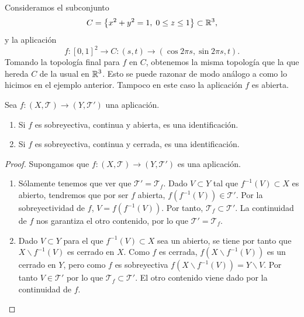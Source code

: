 \begin{eg}
Consideramos el subconjunto 
\[ C = \left\{ x^{2}+y^{2}=1, \; 0 \leq z \leq 1\right\} \subset \mathbb{R}^{3} ,\]
y la aplicación 
\[f : \left[0,1\right] ^{2} \to C : \left(s,t\right)\to \left(\cos 2\pi s, \sin 2\pi s, t\right) .\]
Tomando la topología final para $\displaystyle f $ en $\displaystyle C $, obtenemos la misma topología que la que hereda $\displaystyle C $ de la usual en $\displaystyle \mathbb{R}^{3} $. Esto se puede razonar de modo análogo a como lo hicimos en el ejemplo anterior. Tampoco en este caso la aplicación $\displaystyle f $ es abierta. 
\end{eg}
\begin{prop}
	Sea $\displaystyle f : \left(X, \mathcal{T}\right)\to \left(Y, \mathcal{T}'\right) $ una aplicación. 
	\begin{enumerate}
	\item Si $\displaystyle f $ es sobreyectiva, continua y abierta, es una identificación.
	\item Si $\displaystyle f $ es sobreyectiva, continua y cerrada, es una identificación.
	\end{enumerate}
\end{prop}
\begin{proof}
Supongamos que $\displaystyle f : \left(X, \mathcal{T}\right)\to \left(Y, \mathcal{T}'\right) $ es una aplicación. 
\begin{enumerate}
\item Sólamente tenemos que ver que $\displaystyle \mathcal{T}'=\mathcal{T}_{f} $. Dado $\displaystyle V \subset Y $ tal que $\displaystyle f^{-1}\left(V\right)\subset X $ es abierto, tendremos que por ser $\displaystyle f $ abierta, $\displaystyle f\left(f^{-1}\left(V\right)\right)\in \mathcal{T}' $. Por la sobreyectividad de $\displaystyle f $, $\displaystyle V = f\left(f^{-1}\left(V\right)\right) $. Por tanto, $\displaystyle \mathcal{T}_{f}\subset \mathcal{T}' $. La continuidad de $\displaystyle f $ nos garantiza el otro contenido, por lo que $\displaystyle \mathcal{T}' = \mathcal{T}_{f} $. 
\item Dado $\displaystyle V \subset Y $ para el que $\displaystyle f^{-1}\left(V\right)\subset X $ sea un abierto, se tiene por tanto que $\displaystyle X\backslash f^{-1}\left(V\right) $ es cerrado en $\displaystyle X $. Como $\displaystyle f $ es cerrada, $\displaystyle f\left(X\backslash f^{-1}\left(V\right)\right) $ es un cerrado en $\displaystyle Y $, pero como $\displaystyle f $ es sobreyectiva $\displaystyle f\left(X \backslash f^{-1}\left(V\right)\right)=Y \backslash V $. Por tanto $\displaystyle V \in \mathcal{T}' $ por lo que $\displaystyle \mathcal{T}_{f}\subset \mathcal{T}' $. El otro contenido viene dado por la continuidad de $\displaystyle f $. 
\end{enumerate}
\end{proof}

